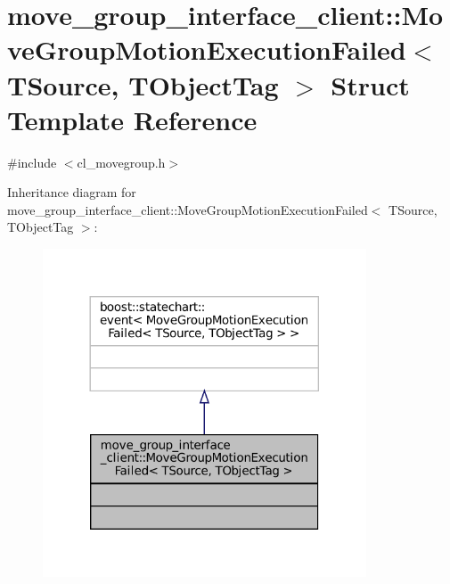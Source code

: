 \hypertarget{structmove__group__interface__client_1_1MoveGroupMotionExecutionFailed}{}\section{move\+\_\+group\+\_\+interface\+\_\+client\+:\+:Move\+Group\+Motion\+Execution\+Failed$<$ T\+Source, T\+Object\+Tag $>$ Struct Template Reference}
\label{structmove__group__interface__client_1_1MoveGroupMotionExecutionFailed}


{\ttfamily \#include $<$cl\+\_\+movegroup.\+h$>$}



Inheritance diagram for move\+\_\+group\+\_\+interface\+\_\+client\+:\+:Move\+Group\+Motion\+Execution\+Failed$<$ T\+Source, T\+Object\+Tag $>$\+:
\nopagebreak
\begin{figure}[H]
\begin{center}
\leavevmode
\includegraphics[width=272pt]{structmove__group__interface__client_1_1MoveGroupMotionExecutionFailed__inherit__graph}
\end{center}
\end{figure}


